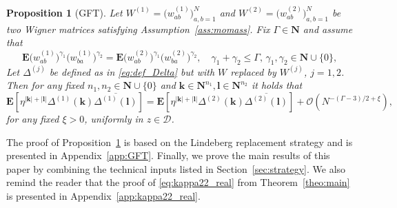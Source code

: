 \documentclass[10pt]{amsart}
\newtheorem{proposition}[theorem]{Proposition}
\numberwithin{equation}{section}
\newcommand{\cob}{\color{blue}}
\newcommand{\nc}{\normalcolor}
\newcommand{\E}{\mathbf{E}}
\newcommand{\N}{\mathbf{N}}
\begin{document}
\begin{proposition}[GFT]\label{prop:GFT} Let $W^{(1)}=\big(w^{(1)}_{ab}\big)_{a,b=1}^N$ and $W^{(2)}=\big(w^{(2)}_{ab}\big)_{a,b=1}^N$ be two Wigner matrices satisfying Assumption~\ref{ass:momass}. Fix $\Gamma\in\N$ and assume that 
\begin{equation}
\E \big(w^{(1)}_{ab}\big)^{\gamma_1}\big(w^{(1)}_{ba}\big)^{\gamma_2} = \E \big(w^{(2)}_{ab}\big)^{\gamma_1}\big(w^{(2)}_{ba}\big)^{\gamma_2},\quad \gamma_1+\gamma_2\le \Gamma,\, \gamma_1,\gamma_2\in\N\cup\{0\},
\label{eq:GFT_condition}
\end{equation}
Let $\Delta^{(j)}$ be defined as in \eqref{eq:def_Delta} but with $W$ replaced by $W^{(j)}$, $j=1,2$. Then for any fixed $n_1,n_2\in\N\cup\{0\}$ and $\bm{k}\in\N^{n_1},\bm{l}\in\N^{n_2}$ it holds that
\begin{equation}
\E \left[\eta^{|\bm{k}|+|\bm{l}|}\Delta^{(1)} (\bm{k})\overline{\Delta^{(1)}(\bm{l})}\right]=\E \left[\eta^{|\bm{k}|+|\bm{l}|}\Delta^{(2)} (\bm{k})\overline{\Delta^{(2)}(\bm{l})}\right] + \mathcal{O}\left(N^{-(\Gamma-3)/2+\xi}\right),
\label{eq:E_match}
\end{equation}
for any fixed $\xi>0$, uniformly in $z\in\mathcal{D}$.
\end{proposition}

The proof of Proposition~\ref{prop:GFT} is based on the Lindeberg replacement strategy and is presented in Appendix~\ref{app:GFT}. Finally, we prove the main results of this paper by combining the technical inputs listed in Section~\ref{sec:strategy}. We also remind the reader that the proof of \eqref{eq:kappa22_real} from Theorem~\ref{theo:main} is presented in Appendix~\ref{app:kappa22_real}.   
\end{document}

